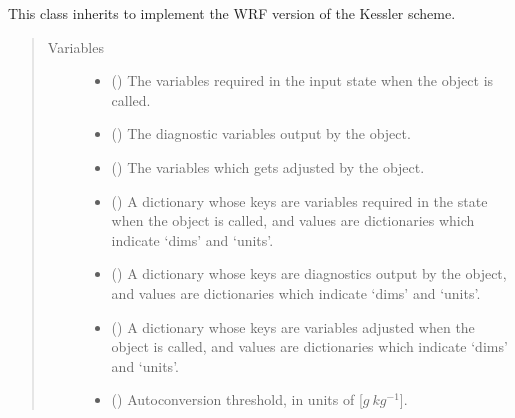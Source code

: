 \documentclass[letterpaper,10pt,english]{sphinxmanual}
\begin{document}
\begin{fulllineitems}
\label{\detokenize{api:parameterizations.adjustment_microphysics_kessler_wrf.AdjustmentMicrophysicsKesslerWRF}}
This class inherits 
to implement the WRF version of the Kessler scheme.
\begin{quote}\begin{description}
\item[{Variables}] \leavevmode\begin{itemize}
\item {} 
 () \textendash{} The variables required in the input state when the object is called.

\item {} 
 () \textendash{} The diagnostic variables output by the object.

\item {} 
 () \textendash{} The variables which gets adjusted by the object.

\item {} 
 () \textendash{} A dictionary whose keys are variables required in the state when the object is called,
and values are dictionaries which indicate ‘dims’ and ‘units’.

\item {} 
 () \textendash{} A dictionary whose keys are diagnostics output by the object,
and values are dictionaries which indicate ‘dims’ and ‘units’.

\item {} 
 () \textendash{} A dictionary whose keys are variables adjusted when the object is called,
and values are dictionaries which indicate ‘dims’ and ‘units’.

\item {} 
 () \textendash{} Autoconversion threshold, in units of {[}\(g ~ kg^{-1}\){]}.


\end{itemize}
\end{description}
\end{quote}
\end{fulllineitems}
\end{document}
